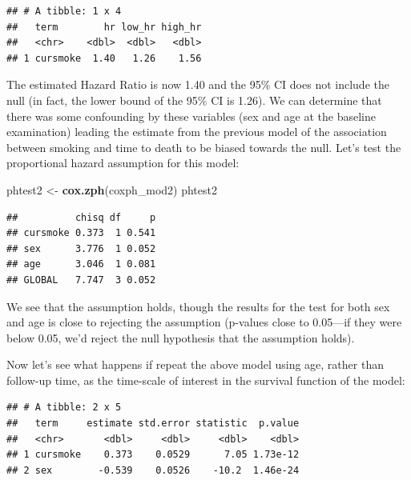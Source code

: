 \documentclass[
]{book}
\newenvironment{Shaded}{\begin{snugshade}}{\end{snugshade}}
\newcommand{\DataTypeTok}[1]{\textcolor[rgb]{0.13,0.29,0.53}{#1}}
\newcommand{\KeywordTok}[1]{\textcolor[rgb]{0.13,0.29,0.53}{\textbf{#1}}}
\newcommand{\NormalTok}[1]{#1}
\newcommand{\OperatorTok}[1]{\textcolor[rgb]{0.81,0.36,0.00}{\textbf{#1}}}
\newcommand{\StringTok}[1]{\textcolor[rgb]{0.31,0.60,0.02}{#1}}
\begin{document}
\begin{verbatim}
## # A tibble: 1 x 4
##   term        hr low_hr high_hr
##   <chr>    <dbl>  <dbl>   <dbl>
## 1 cursmoke  1.40   1.26    1.56
\end{verbatim}

The estimated Hazard Ratio is now 1.40 and the 95\% CI does not include the null (in fact, the lower bound of the 95\% CI is 1.26). We can determine that there was some confounding by these variables (sex and age at the baseline examination) leading the estimate from the previous model of the association between smoking and time to death to be biased towards the null. Let's test the proportional hazard assumption for this model:

\begin{Shaded}
\begin{Highlighting}[]
\NormalTok{phtest2 <-}\StringTok{ }\KeywordTok{cox.zph}\NormalTok{(coxph_mod2)}
\NormalTok{phtest2}
\end{Highlighting}
\end{Shaded}

\begin{verbatim}
##          chisq df     p
## cursmoke 0.373  1 0.541
## sex      3.776  1 0.052
## age      3.046  1 0.081
## GLOBAL   7.747  3 0.052
\end{verbatim}

We see that the assumption holds, though the results for the test for both sex and age is close to rejecting the assumption (p-values close to 0.05---if they were below 0.05, we'd reject the null hypothesis that the assumption holds).

Now let's see what happens if repeat the above model using age, rather than follow-up time, as the time-scale of interest in the survival function of the model:

\begin{Shaded}
\end{Shaded}

\begin{verbatim}
## # A tibble: 2 x 5
##   term     estimate std.error statistic  p.value
##   <chr>       <dbl>     <dbl>     <dbl>    <dbl>
## 1 cursmoke    0.373    0.0529      7.05 1.73e-12
## 2 sex        -0.539    0.0526    -10.2  1.46e-24
\end{verbatim}
\end{document}
